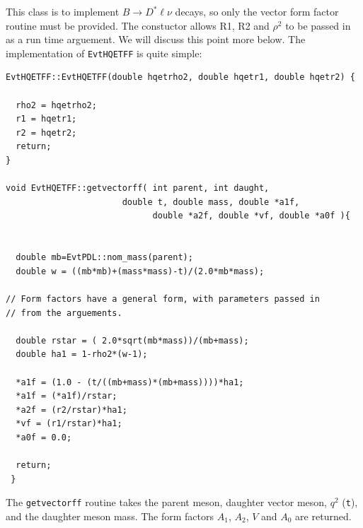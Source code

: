 \noindent This class is to implement $B \rightarrow D^* \ell \nu$
decays, so only the vector form factor routine must be
provided.  The constuctor allows R1, R2 and $\rho^2$ to
be passed in as a run time arguement.  We will discuss this
point more below.  The implementation of {\tt EvtHQETFF} is
quite simple:
\begin{verbatim}
EvtHQETFF::EvtHQETFF(double hqetrho2, double hqetr1, double hqetr2) {

  rho2 = hqetrho2;
  r1 = hqetr1;
  r2 = hqetr2;
  return;
}

void EvtHQETFF::getvectorff( int parent, int daught,
                       double t, double mass, double *a1f,
                             double *a2f, double *vf, double *a0f ){


  double mb=EvtPDL::nom_mass(parent);
  double w = ((mb*mb)+(mass*mass)-t)/(2.0*mb*mass);

// Form factors have a general form, with parameters passed in
// from the arguements.

  double rstar = ( 2.0*sqrt(mb*mass))/(mb+mass);
  double ha1 = 1-rho2*(w-1);

  *a1f = (1.0 - (t/((mb+mass)*(mb+mass))))*ha1;
  *a1f = (*a1f)/rstar;
  *a2f = (r2/rstar)*ha1;
  *vf = (r1/rstar)*ha1;
  *a0f = 0.0;

  return;
 }
\end{verbatim}
The {\tt getvectorff} routine takes the parent meson,
daughter vector meson, $q^2$ ({\tt t}), and the daughter meson
mass.  The form factors $A_1$, $A_2$, $V$ and $A_0$ are
returned.

